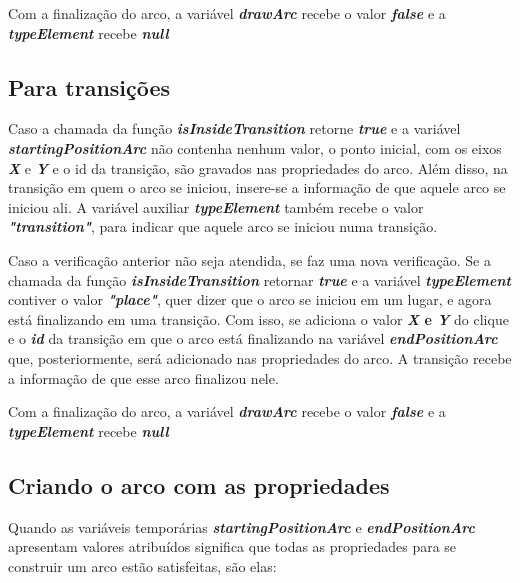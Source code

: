 \documentclass[
	12pt,				%
	openright,			%
	oneside,			%
	a4paper,			%
	english,			%
	brazil				%
	]{abntex2}
\begin{document}
Com a finalização do arco, a variável \textbf{\textit{drawArc}} recebe o valor \textbf{\textit{false}} e a \textbf{\textit{typeElement}} recebe \textbf{\textit{null}}



\subsection*{Para transições}

Caso a chamada da função \textbf{\textit{isInsideTransition}} retorne \textbf{\textit{true}} e a variável \textbf{\textit{startingPositionArc}} não contenha nenhum valor, o ponto inicial, com os eixos \textbf{\textit{X}} e \textbf{\textit{Y}} e o id da transição, são gravados nas propriedades do arco. Além disso, na transição em quem o arco se iniciou, insere-se a informação de que aquele arco se iniciou ali. A variável auxiliar \textbf{\textit{typeElement}} também recebe o valor \textbf{\textit{"transition"}}, para indicar que aquele arco se iniciou numa transição. 

Caso a verificação anterior não seja atendida, se faz uma nova verificação. Se a chamada da função \textbf{\textit{isInsideTransition}} retornar \textbf{\textit{true}} e a variável \textbf{\textit{typeElement}} contiver o valor \textbf{\textit{"place"}}, quer dizer que o arco se iniciou em um lugar, e agora está finalizando em uma transição. Com isso, se adiciona o valor \textbf{\textit{X} e \textbf{\textit{Y}}} do clique e o \textbf{\textit{id}} da transição em que o arco está finalizando na variável \textbf{\textit{endPositionArc}} que, posteriormente, será adicionado nas propriedades do arco. A transição recebe a informação de que esse arco finalizou nele.

Com a finalização do arco, a variável \textbf{\textit{drawArc}} recebe o valor \textbf{\textit{false}} e a \textbf{\textit{typeElement}} recebe \textbf{\textit{null}}



\subsection*{Criando o arco com as propriedades}

Quando as variáveis temporárias \textbf{\textit{startingPositionArc}} e \textbf{\textit{endPositionArc}} apresentam valores atribuídos significa que todas as propriedades para se construir um arco estão satisfeitas, são elas:
\end{document}
